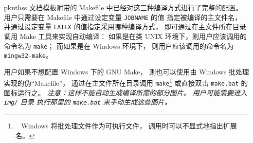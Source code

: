 	pkuthss 文档模板附带的 Makefile 中已经对这三种编译方式进行了完整的配置。
	用户只需要在 Makefile 中通过设定变量 \verb|JOBNAME| 的值%
	指定被编译的主文件名，
	并通过设定变量 \verb|LATEX| 的值指定采用哪种编译方式，
	即可通过在主文件所在目录调用 Make 工具来实现自动编译：
	如果是在类 UNIX 环境下，则用户应该调用的命令名为 \verb|make|；
	而如果是在 Windows 环境下，
	则用户应该调用的命令名为 \verb|mingw32-make|。

	用户如果不想配置 Windows 下的 GNU Make，
	则也可以使用由 Windows 批处理实现的伪“Makefile”，
	通过在主文件所在目录调用 \verb|make|\footnote%
	{\ %
		Windows 将批处理文件作为可执行文件，
		调用时可以不显式地指出扩展名。
	} 或直接双击 \verb|make.bat| 的图标运行之。%
	\emph
	{%
		注意：这样不能自动生成编译所需的部分图片。
		用户可能需要进入 \texttt{img/} 目录%
		执行那里的 \texttt{make.bat} 来手动生成这些图片。
	}

